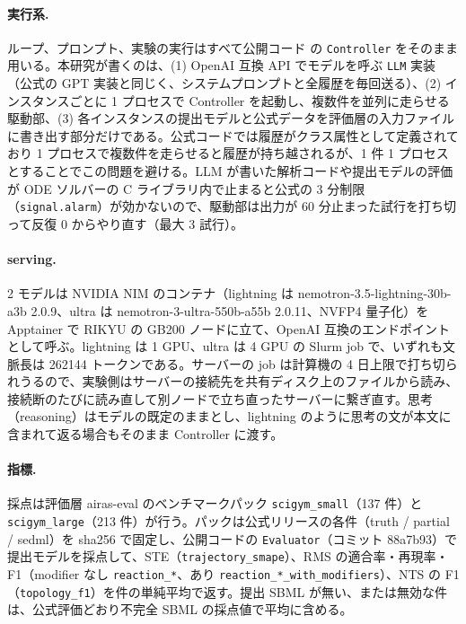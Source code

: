 \documentclass{article}
\begin{document}
\paragraph{実行系.}
ループ、プロンプト、実験の実行はすべて公開コード \citep{h4duan-2025-scigym} の \texttt{Controller} をそのまま用いる。本研究が書くのは、(1) OpenAI 互換 API でモデルを呼ぶ \texttt{LLM} 実装（公式の GPT 実装と同じく、システムプロンプトと全履歴を毎回送る）、(2) インスタンスごとに 1 プロセスで Controller を起動し、複数件を並列に走らせる駆動部、(3) 各インスタンスの提出モデルと公式データを評価層の入力ファイルに書き出す部分だけである。公式コードでは履歴がクラス属性として定義されており 1 プロセスで複数件を走らせると履歴が持ち越されるが、1 件 1 プロセスとすることでこの問題を避ける。LLM が書いた解析コードや提出モデルの評価が ODE ソルバーの C ライブラリ内で止まると公式の 3 分制限（\texttt{signal.alarm}）が効かないので、駆動部は出力が 60 分止まった試行を打ち切って反復 0 からやり直す（最大 3 試行）。

\paragraph{serving.}
2 モデルは NVIDIA NIM のコンテナ（lightning は nemotron-3.5-lightning-30b-a3b 2.0.9、ultra は nemotron-3-ultra-550b-a55b 2.0.11、NVFP4 量子化）を Apptainer で RIKYU の GB200 ノードに立て、OpenAI 互換のエンドポイントとして呼ぶ。lightning は 1 GPU、ultra は 4 GPU の Slurm job で、いずれも文脈長は 262144 トークンである。サーバーの job は計算機の 4 日上限で打ち切られうるので、実験側はサーバーの接続先を共有ディスク上のファイルから読み、接続断のたびに読み直して別ノードで立ち直ったサーバーに繋ぎ直す。思考（reasoning）はモデルの既定のままとし、lightning のように思考の文が本文に含まれて返る場合もそのまま Controller に渡す。

\paragraph{指標.}
採点は評価層 airas-eval のベンチマークパック \texttt{scigym\_small}（137 件）と \texttt{scigym\_large}（213 件）が行う。パックは公式リリースの各件（truth / partial / sedml）を sha256 で固定し、公開コードの \texttt{Evaluator}（コミット 88a7b93）で提出モデルを採点して、STE（\texttt{trajectory\_smape}）、RMS の適合率・再現率・F1（modifier なし \texttt{reaction\_*}、あり \texttt{reaction\_*\_with\_modifiers}）、NTS の F1（\texttt{topology\_f1}）を件の単純平均で返す。提出 SBML が無い、または無効な件は、公式評価どおり不完全 SBML の採点値で平均に含める。
\end{document}
